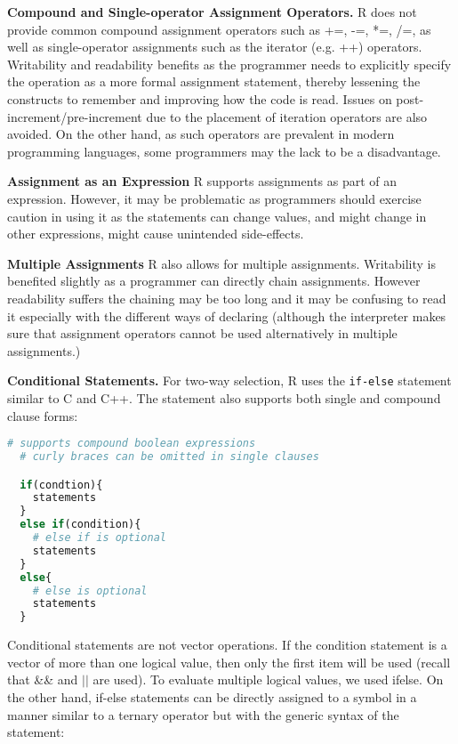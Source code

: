 \documentclass[12pt]{article}
\begin{document}
\textbf{Compound and Single-operator Assignment Operators.} R does not provide common compound assignment operators such as +=, -=, *=, /=, as well as single-operator assignments such as the iterator (e.g. ++) operators. Writability and readability benefits as the programmer needs to explicitly specify the operation as a more formal assignment statement, thereby lessening the constructs to remember and improving how the code is read. Issues on post-increment/pre-increment due to the placement of iteration operators are also avoided. On the other hand, as such operators are prevalent in modern programming languages, some programmers may the lack to be a disadvantage.

\textbf{Assignment as an Expression} R supports assignments as part of an expression. However, it may be problematic as programmers should exercise caution in using it as the statements can change values, and might change in other expressions, might cause unintended side-effects.

\textbf{Multiple Assignments} R also allows for multiple assignments. Writability is benefited slightly as a programmer can directly chain assignments. However readability suffers the chaining may be too long and it may be confusing to read it especially with the different ways of declaring (although the interpreter makes sure that assignment operators cannot be used alternatively in multiple assignments.)

\textbf{Conditional Statements.} For two-way selection, R uses the \texttt{if-else} statement similar to C and C++. The statement also supports both single and compound clause forms:

\begin{lstlisting}[language=R ]
  # supports compound boolean expressions
  # curly braces can be omitted in single clauses

  if(condtion){
    statements
  }
  else if(condition){
    # else if is optional
    statements
  }
  else{
    # else is optional
    statements
  }
\end{lstlisting}

Conditional statements are not vector operations. If the condition statement is a vector of more than one logical value, then only the first item will be used (recall that \&\& and \(||\) are used). To evaluate multiple logical values, we used ifelse. On the other hand, if-else statements can be directly assigned to a symbol in a manner similar to a ternary operator but with the generic syntax of the statement:
\end{document}
